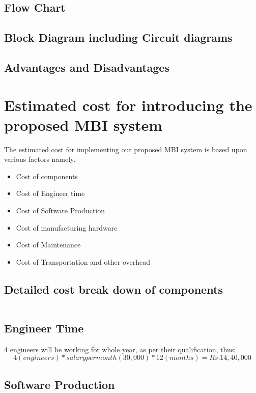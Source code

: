 \documentclass[12pt]{article}
\begin{document}
\subsection{Flow Chart}
\subsection{Block Diagram including Circuit diagrams}
\subsection{Advantages and Disadvantages}

\newpage


\section{Estimated cost for introducing the proposed MBI system}
The estimated cost for implementing our proposed MBI system is based
upon various factors namely.
\begin{itemize}
\item Cost of components
\item Cost of Engineer time
\item Cost of Software Production
\item Cost of manufacturing hardware
\item Cost of Maintenance
\item Cost of Transportation and other overhead
\end{itemize}
\subsection{Detailed cost break down of components }
\begin{table}
\begin{tabular}{|c|c|c|}
\hline
\hline
\end{tabular}
\end{table}
\subsection{Engineer Time}
4 engineers will be working for whole year, as per their qualification, thus:
\[4(engineers)*salary per month(30,000)*12(months)=Rs.14,40,000 \]
\subsection{Software Production}
\end{document}
